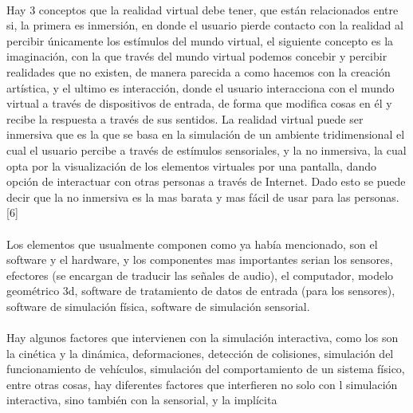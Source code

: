 \documentclass{bmcart}
\begin{document}
\paragraph{}
Hay 3 conceptos que la realidad virtual debe tener, que están relacionados entre si, la primera es inmersión, en donde el usuario pierde contacto con la realidad al percibir únicamente los estímulos del mundo virtual, el siguiente concepto es la imaginación, con la que través del mundo virtual podemos concebir y percibir realidades que no existen, de manera parecida a como hacemos con la creación artística, y el ultimo es interacción, donde el usuario interacciona con el mundo virtual a través de dispositivos de entrada, de forma que modifica cosas en él y recibe la respuesta a través de sus sentidos. La realidad virtual puede ser inmersiva que es la que se basa en la simulación de un ambiente tridimensional el cual el usuario percibe a través de estímulos sensoriales, y la no inmersiva, la cual opta por la visualización de los elementos virtuales por una pantalla, dando opción de interactuar con otras personas a través de Internet. Dado esto se puede decir que la no inmersiva es la mas barata y mas fácil de usar para las personas. [6]
\paragraph{}
Los elementos que usualmente componen como ya había mencionado, son el software y el hardware, y los componentes mas importantes serian los sensores, efectores (se encargan de traducir las señales de audio), el computador, modelo geométrico 3d, software de tratamiento de datos de entrada (para los sensores), software de simulación física, software de simulación sensorial. 
\paragraph{}
Hay algunos factores que intervienen con la simulación interactiva, como los son la  cinética y la dinámica, deformaciones, detección de colisiones, simulación del funcionamiento de vehículos, simulación del comportamiento de un sistema físico, entre otras cosas, hay diferentes factores que interfieren no solo con l simulación interactiva, sino también con la sensorial, y la implícita 
\end{document}
